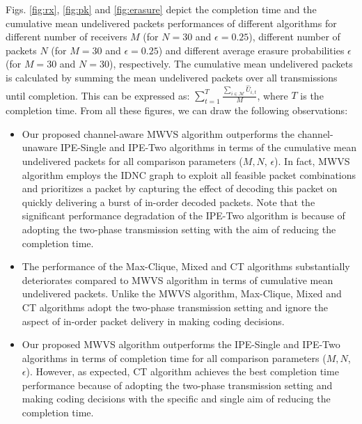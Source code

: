 \documentclass[12pt, peerreview, onecolumn]{IEEEtran}
\begin{document}
Figs. \ref{fig:rx},  \ref{fig:pk} and  \ref{fig:erasure}  depict the completion time  and the  cumulative mean undelivered packets performances of different algorithms for different  number of receivers $M$ (for $N =30$ and $\epsilon = 0.25$),  different number of packets $N$ (for $M =30$ and $\epsilon = 0.25$) and different average erasure probabilities $\epsilon$ (for $M =30$ and $N = 30$),  respectively.\footnotemark {}  The  cumulative mean undelivered packets
is calculated by summing  the mean undelivered packets over all transmissions until completion. This can be expressed as: $\sum_{t=1}^T \frac{\sum_{i \in \mathcal{M}} \hat{U}_{i,t}}{M}$, where $T$ is the completion time.   From all these figures, we can draw the following observations:
\begin{itemize}
\item Our proposed channel-aware MWVS algorithm outperforms the channel-unaware  IPE-Single and IPE-Two  algorithms in terms of the cumulative mean undelivered packets for all comparison parameters ($M, N$, $\epsilon$).
    In fact,  MWVS algorithm employs the IDNC graph  to exploit  all  feasible packet combinations  and prioritizes a packet  by capturing the effect of decoding this packet on  quickly delivering a burst of in-order decoded packets. Note that the significant performance degradation  of the IPE-Two algorithm is because of adopting the two-phase transmission setting with the aim  of reducing the completion time.
\item  The performance of the Max-Clique, Mixed and CT algorithms substantially deteriorates  compared to MWVS algorithm in terms of cumulative mean undelivered packets. Unlike the MWVS  algorithm, Max-Clique, Mixed and CT algorithms adopt the two-phase transmission setting and ignore the aspect of in-order packet delivery  in making coding decisions.
\item Our proposed MWVS algorithm outperforms the IPE-Single and IPE-Two  algorithms in terms of completion time for all comparison parameters ($M, N$,  $\epsilon$).  However,  as expected, CT algorithm achieves the best completion time performance because of  adopting the two-phase  transmission setting and making coding decisions with the specific and single aim of  reducing the completion time.
\end{itemize}
\end{document}

